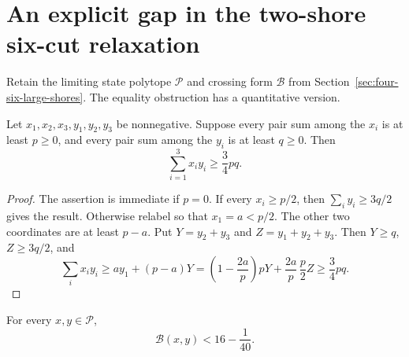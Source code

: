 \section{An explicit gap in the two-shore six-cut relaxation}
\label{sec:four-six-explicit-gap}

Retain the limiting state polytope $\mathcal P$ and crossing form $\mathcal B$ from Section~\ref{sec:four-six-large-shores}.
The equality obstruction has a quantitative version.

\begin{lemma}
\label{lem:four-six-triple-overlap}
Let $x_1,x_2,x_3,y_1,y_2,y_3$ be nonnegative.
Suppose every pair sum among the $x_i$ is at least $p\ge0$, and every pair sum among the $y_i$ is at least $q\ge0$.
Then
\[
 \sum_{i=1}^3x_iy_i\ge\frac34pq.
\]
\end{lemma}

\begin{proof}
The assertion is immediate if $p=0$.
If every $x_i\ge p/2$, then $\sum_i y_i\ge3q/2$ gives the result.
Otherwise relabel so that $x_1=a<p/2$.
The other two coordinates are at least $p-a$.
Put $Y=y_2+y_3$ and $Z=y_1+y_2+y_3$.
Then $Y\ge q$, $Z\ge3q/2$, and
\[
 \sum_i x_iy_i\ge ay_1+(p-a)Y
 =\left(1-\frac{2a}{p}\right)pY
   +\frac{2a}{p}\,\frac p2 Z
 \ge\frac34pq.
\]
\end{proof}

\begin{proposition}
\label{prop:four-six-explicit-gap}
For every $x,y\in\mathcal P$,
\[
 \mathcal B(x,y)<16-\frac1{40}.
\]
\end{proposition}

